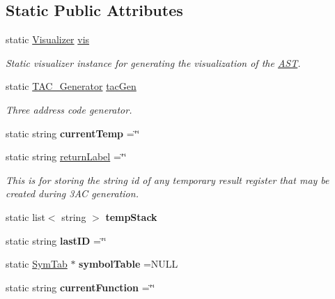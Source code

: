 \subsection*{Static Public Attributes}
\begin{DoxyCompactItemize}
\item 
\hypertarget{classAST_a5fdfd5f7b104dd92889163bdadbc68d6}{static \hyperlink{classVisualizer}{Visualizer} \hyperlink{classAST_a5fdfd5f7b104dd92889163bdadbc68d6}{vis}}\label{classAST_a5fdfd5f7b104dd92889163bdadbc68d6}

\begin{DoxyCompactList}\small\item\em Static visualizer instance for generating the visualization of the \hyperlink{classAST}{A\-S\-T}. \end{DoxyCompactList}\item 
\hypertarget{classAST_a8a3ace322f50e030331065d644ee55ee}{static \hyperlink{classTAC__Generator}{T\-A\-C\-\_\-\-Generator} \hyperlink{classAST_a8a3ace322f50e030331065d644ee55ee}{tac\-Gen}}\label{classAST_a8a3ace322f50e030331065d644ee55ee}

\begin{DoxyCompactList}\small\item\em Three address code generator. \end{DoxyCompactList}\item 
\hypertarget{classAST_a1f69448c6dc368d005631a128460083d}{static string {\bfseries current\-Temp} =\char`\"{}\char`\"{}}\label{classAST_a1f69448c6dc368d005631a128460083d}

\item 
\hypertarget{classAST_a551aec090c932ab69365238b40a8a4eb}{static string \hyperlink{classAST_a551aec090c932ab69365238b40a8a4eb}{return\-Label} =\char`\"{}\char`\"{}}\label{classAST_a551aec090c932ab69365238b40a8a4eb}

\begin{DoxyCompactList}\small\item\em This is for storing the string id of any temporary result register that may be created during 3\-A\-C generation. \end{DoxyCompactList}\item 
\hypertarget{classAST_a73c0a266df52be71e6b527b6aa635173}{static list$<$ string $>$ {\bfseries temp\-Stack}}\label{classAST_a73c0a266df52be71e6b527b6aa635173}

\item 
\hypertarget{classAST_abf9e84b541ff04b7bb64e6e4371512d4}{static string {\bfseries last\-I\-D} =\char`\"{}\char`\"{}}\label{classAST_abf9e84b541ff04b7bb64e6e4371512d4}

\item 
\hypertarget{classAST_a163003bfe9c30510ec8039870346049f}{static \hyperlink{classSymTab}{Sym\-Tab} $\ast$ {\bfseries symbol\-Table} =N\-U\-L\-L}\label{classAST_a163003bfe9c30510ec8039870346049f}

\item 
\hypertarget{classAST_a5c3cc894d9c0453523dec9ed76f18a04}{static string {\bfseries current\-Function} =\char`\"{}\char`\"{}}\label{classAST_a5c3cc894d9c0453523dec9ed76f18a04}

\end{DoxyCompactItemize}
